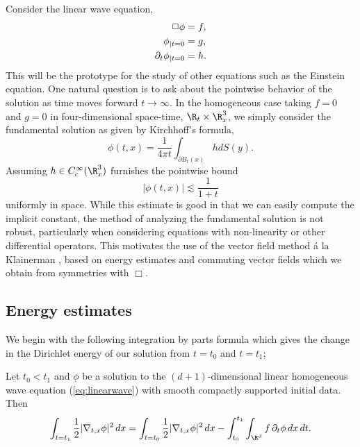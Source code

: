Consider the linear wave equation, 
\begin{align}
	\Box \phi  					&= f, \notag \\
	\phi_{|t = 0}				&= g, \label{eq:linearwave}\\
	\partial_t \phi_{|t = 0}	&= h.\notag
\end{align}
This will be the prototype for the study of other equations such as the Einstein equation. One natural question is to ask about the pointwise behavior of the solution as time moves forward $t\to \infty$. In the homogeneous case taking $f = 0$ and $g = 0$ in four-dimensional space-time, $\R_t \times \R^3_x$, we simply consider the fundamental solution as given by Kirchhoff's formula, 
	\[ \phi(t, x) = \frac{1}{4\pi t} \int_{\partial B_t (x)} h dS(y). \]
Assuming $h \in C_c^\infty (\R^3_x)$ furnishes the pointwise bound
	\[ |\phi(t, x)| \lesssim \frac{1}{1 + t} \]	
uniformly in space. While this estimate is good in that we can easily compute the implicit constant, the method of analyzing the fundamental solution is not robust, particularly when considering equations with non-linearity or other differential operators. This motivates the use of the vector field method \'a la Klainerman \cite{Klainerman1985}, based on energy estimates and commuting vector fields which we obtain from symmetries with $\Box$. 

\subsection{Energy estimates}
We begin with the following integration by parts formula which gives the change in the Dirichlet energy of our solution from $t = t_0$ and $t = t_1$;

\begin{theorem}
	Let $t_0 < t_1$ and $\phi$ be a solution to the $(d + 1)$-dimensional linear homogeneous wave equation (\ref{eq:linearwave}) with smooth compactly supported initial data. Then 
		\[ \int_{t = t_1} \frac12 |\nabla_{t, x} \phi|^2 \, dx = \int_{t = t_0} \frac12 |\nabla_{t, x} \phi|^2 \, dx - \int_{t_0}^{t_1} \int_{\R^d} f \, \partial_t \phi \, dx \, dt.  \] \label{thm:conserve}
\end{theorem}

